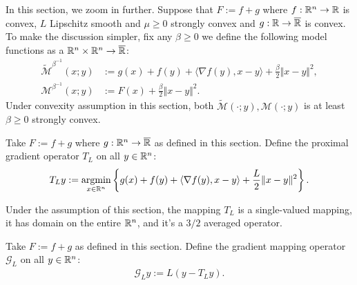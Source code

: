 \documentclass[12pt]{article}
\begin{document}
            In this section, we zoom in further. 
            Suppose that $F:= f + g$ where $f:\mathbb R^n \rightarrow \mathbb R$ is convex, $L$ Lipschitz smooth and $\mu \ge 0$ strongly convex and $g: \mathbb R\rightarrow \overline {\mathbb R}$ is convex. 
            To make the discussion simpler, fix any $\beta \ge 0$ we define the following model functions as a $\mathbb R^n \times \mathbb R^n \rightarrow \overline {\mathbb R}$: 
            \begin{align*}
                \widetilde{\mathcal M}^{\beta^{-1}}
                (x; y)
                &:= 
                g(x) + f(y) + \langle \nabla f(y), x - y\rangle
                + \frac{\beta}{2}\Vert x - y\Vert^2,
                \\
                \mathcal M^{\beta^{-1}}(x; y) 
                &:= F(x) + \frac{\beta}{2}\Vert x - y\Vert^2.
            \end{align*}
            Under convexity assumption in this section, both $\widetilde {\mathcal M} (\cdot; y),  {\mathcal M}(\cdot;y )$ is at least $\beta \ge 0$ strongly convex. 
            \begin{definition}
                Take $F := f + g$ where $g: \mathbb R^n \rightarrow \overline {\mathbb R}$ as defined in this section. 
                Define the proximal gradient operator $T_L$ on all $y \in \mathbb R^n$: 
                \begin{align*}
                    T_L y := \mathop{\rm argmin}\limits_{x \in \mathbb R^n} \left\lbrace
                        g(x) + f(y) + \langle \nabla f(y), x - y\rangle 
                        + \frac{L}{2}\Vert x- y \Vert^2
                    \right\rbrace. 
                \end{align*}
            \end{definition}
            \begin{remark}
                Under the assumption of this section, the mapping $T_L$ is a single-valued mapping, it has domain on the entire $\mathbb R^n$, and it's a $3/2$ averaged operator. 
            \end{remark}
            \begin{definition}
                Take $F := f + g$ as defined in this section. 
                Define the gradient mapping operator $\mathcal G_L$ on all $y \in \mathbb R^n$: 
                \begin{align*}
                    \mathcal G_L y:= L(y - T_L y). 
                \end{align*}
            \end{definition}
\end{document}
